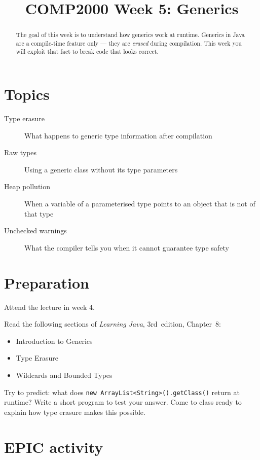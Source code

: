 \documentclass[twoside=false,DIV=14]{scrartcl}
\title{\color{redish} \vspace{-1em}COMP2000 Week 5: Generics}
\begin{document}
{\color{blackish}\maketitle}\vspace{-7em}

\begin{abstract}
The goal of this week is to understand how generics work at runtime.  Generics in Java are a compile-time feature only --- they are \emph{erased} during compilation.  This week you will exploit that fact to break code that looks correct.
\end{abstract}

\section*{Topics}
\begin{description}
\item[Type erasure] What happens to generic type information after compilation
\item[Raw types] Using a generic class without its type parameters
\item[Heap pollution] When a variable of a parameterised type points to an object that is not of that type
\item[Unchecked warnings] What the compiler tells you when it cannot guarantee type safety
\end{description}

\section*{Preparation}
Attend the lecture in week 4.

Read the following sections of \textit{Learning Java}, 3rd~edition, Chapter~8:
\begin{itemize}
    \item Introduction to Generics
    \item Type Erasure
    \item Wildcards and Bounded Types
\end{itemize}

Try to predict: what does \texttt{new ArrayList<String>().getClass()} return at runtime?  Write a short program to test your answer.
Come to class ready to explain how type erasure makes this possible.


\section*{EPIC activity}
\end{document}
